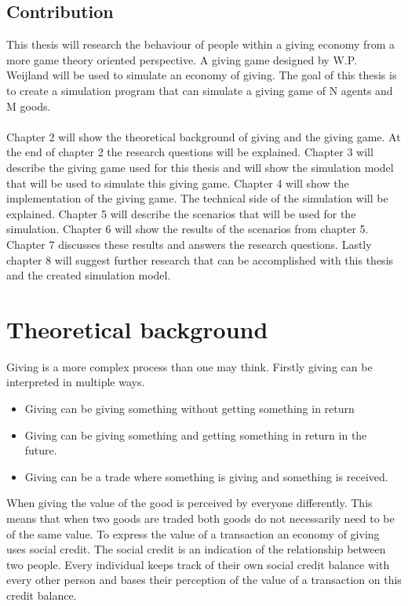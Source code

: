 \documentclass[twoside,openright]{uva-bachelor-thesis}
\begin{document}
\section{Contribution}
This thesis will research the behaviour of people within a giving economy from a more game theory oriented perspective. A giving game designed by W.P. Weijland will be used to simulate an economy of giving. The goal of this thesis is to create a simulation program that can simulate a giving game of N agents and M goods. 
\\
\\
Chapter 2 will show the theoretical background of giving and the giving game. At the end of chapter 2 the research questions will be explained. Chapter 3 will describe the giving game used for this thesis and will show the simulation model that will be used to simulate this giving game. Chapter 4 will show the implementation of the giving game. The technical side of the simulation will be explained. Chapter 5 will describe the scenarios that will be used for the simulation. Chapter 6 will show the results of the scenarios from chapter 5. Chapter 7 discusses these results and answers the research questions. Lastly chapter 8 will suggest further research that can be accomplished with this thesis and the created simulation model.




\chapter{Theoretical background}
Giving is a more complex process than one may think. Firstly giving can be interpreted in multiple ways.
\begin{itemize}
  \item Giving can be giving something without getting something in return
  \item Giving can be giving something and getting something in return in the future.
  \item Giving can be a trade where something is giving and something is received.
\end{itemize}
When giving the value of the good is perceived by everyone differently. This means that when two goods are traded both goods do not necessarily need to be of the same value. To express the value of a transaction an economy of giving uses social credit. The social credit is an indication of the relationship between two people. Every individual keeps track of their own social credit balance with every other person and bases their perception of the value of a transaction on this credit balance.
\end{document}
